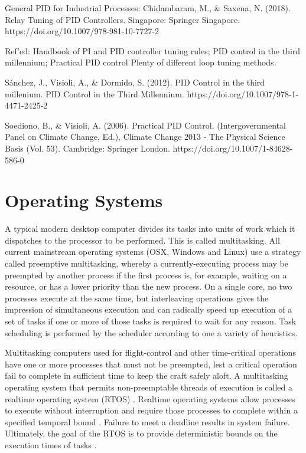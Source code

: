 General PID for Industrial Processes:
\cite{Saxena}
Chidambaram, M., \& Saxena, N. (2018). Relay Tuning of PID Controllers. Singapore: Springer Singapore. https://doi.org/10.1007/978-981-10-7727-2

Ref’ed: Handbook of PI and  PID controller tuning rules; PID control in the third millennium; Practical PID control
Plenty of different loop tuning methods.

\cite{Sanchez2012}
Sánchez, J., Visioli, A., \& Dormido, S. (2012). PID Control in the third millenium. PID Control in the Third Millennium. https://doi.org/10.1007/978-1-4471-2425-2

\cite{Soediono1989}
Soediono, B., \& Visioli, A. (2006). Practical PID Control. (Intergovernmental Panel on Climate Change, Ed.), Climate Change 2013 - The Physical Science Basis (Vol. 53). Cambridge: Springer London. https://doi.org/10.1007/1-84628-586-0

\section{Operating Systems}

A typical modern desktop computer divides its tasks into units of work which it dispatches to the processor to be performed. This is called multitasking. All current mainstream operating systems (OSX, Windows and Linux) use a strategy called preemptive multitasking, whereby a currently-executing process may be preempted by another process if the first process is, for example, waiting on a resource, or has a lower priority than the new process. On a single core, no two processes execute at the same time, but interleaving operations gives the impression of simultaneous execution and can radically speed up execution of a set of tasks if one or more of those tasks is required to wait for any reason. Task scheduling is performed by the scheduler according to one a variety of heuristics.

Multitasking computers used for flight-control and other time-critical operations have one or more processes that must not be preempted, lest a critical operation fail to complete in sufficient time to keep the craft safely aloft. A multitasking operating system that permits non-preemptable threads of execution is called a realtime operating system (RTOS) \cite{Foundation2018,BristotdeOliveira2018}. Realtime operating systems allow processes to execute without interruption and require those processes to complete within a specified temporal bound \cite{BristotdeOliveira2018}. Failure to meet a deadline results in system failure. Ultimately, the goal of the RTOS is to provide deterministic bounds on the execution times of tasks \cite{BristotdeOliveira2018}.

